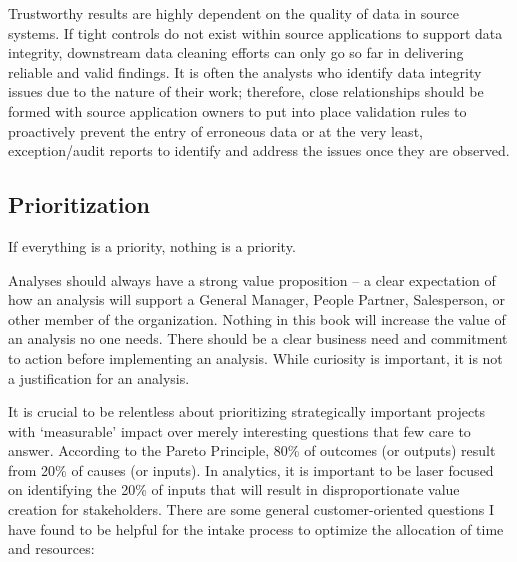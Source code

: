 \documentclass[
]{book}
\begin{document}
Trustworthy results are highly dependent on the quality of data in source systems. If tight controls do not exist within source applications to support data integrity, downstream data cleaning efforts can only go so far in delivering reliable and valid findings. It is often the analysts who identify data integrity issues due to the nature of their work; therefore, close relationships should be formed with source application owners to put into place validation rules to proactively prevent the entry of erroneous data or at the very least, exception/audit reports to identify and address the issues once they are observed.

\hypertarget{prioritization}{%
\subsection{Prioritization}\label{prioritization}}

If everything is a priority, nothing is a priority.

Analyses should always have a strong value proposition -- a clear expectation of how an analysis will support a General Manager, People Partner, Salesperson, or other member of the organization. Nothing in this book will increase the value of an analysis no one needs. There should be a clear business need and commitment to action before implementing an analysis. While curiosity is important, it is not a justification for an analysis.

It is crucial to be relentless about prioritizing strategically important projects with `measurable' impact over merely interesting questions that few care to answer. According to the Pareto Principle, 80\% of outcomes (or outputs) result from 20\% of causes (or inputs). In analytics, it is important to be laser focused on identifying the 20\% of inputs that will result in disproportionate value creation for stakeholders. There are some general customer-oriented questions I have found to be helpful for the intake process to optimize the allocation of time and resources:
\end{document}
